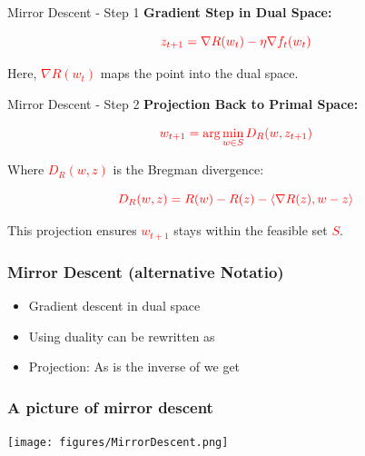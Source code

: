 \documentclass{beamer}
\begin{document}
\begin{small}
\begin{frame}{Mirror Descent - Step 1}
\textbf{Gradient Step in Dual Space:}

\begin{equation*}
\textcolor{red}{z_{t+1} = \nabla R(w_t) - \eta \nabla f_t(w_t)}
\end{equation*}

Here, \textcolor{red}{$\nabla R(w_t)$} maps the point into the dual space.
\end{frame}

\begin{frame}{Mirror Descent - Step 2}
\textbf{Projection Back to Primal Space:}

\begin{equation*}
\textcolor{red}{w_{t+1} = \arg\min_{w \in S} D_R(w, z_{t+1})}
\end{equation*}

Where \textcolor{red}{$D_R(w, z)$} is the Bregman divergence:

\begin{equation*}
\textcolor{red}{D_R(w, z) = R(w) - R(z) - \langle \nabla R(z), w - z \rangle}
\end{equation*}

This projection ensures \textcolor{red}{$w_{t+1}$} stays within the feasible set \textcolor{red}{$S$}.
\end{frame}

\begin{frame}
  \frametitle{Mirror Descent (alternative Notatio)}
  \begin{itemize}
  \item Gradient descent in dual space
  \item Using duality can be rewritten as
  \item Projection: As \R{$\nabla \Phi$} is the inverse of \R{$\nabla \Phi^*$} we get
  \end{itemize}
\end{frame}


\begin{frame}
  \frametitle{A picture of mirror descent}
\texttt{[image: figures/MirrorDescent.png]}
\end{frame}



\end{small}
\end{document}
